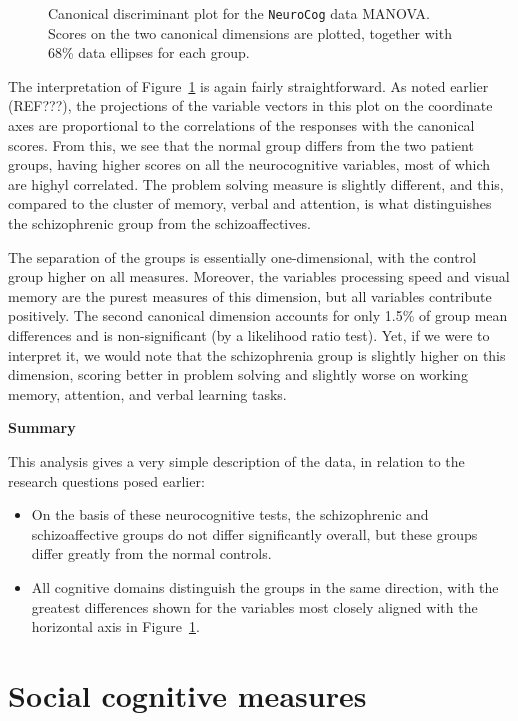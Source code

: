 \documentclass[
  letterpaper,
  10pt,
  krantz2]{krantz}
\begin{document}
{\begin{figure}[H]
{}

\caption{\label{fig-NC-candisc}Canonical discriminant plot for the
\texttt{NeuroCog} data MANOVA. Scores on the two canonical dimensions
are plotted, together with 68\% data ellipses for each group.}

\end{figure}%

The interpretation of Figure~\ref{fig-NC-candisc} is again fairly
straightforward. As noted earlier (REF???), the projections of the
variable vectors in this plot on the coordinate axes are proportional to
the correlations of the responses with the canonical scores. From this,
we see that the normal group differs from the two patient groups, having
higher scores on all the neurocognitive variables, most of which are
highyl correlated. The problem solving measure is slightly different,
and this, compared to the cluster of memory, verbal and attention, is
what distinguishes the schizophrenic group from the schizoaffectives.

The separation of the groups is essentially one-dimensional, with the
control group higher on all measures. Moreover, the variables processing
speed and visual memory are the purest measures of this dimension, but
all variables contribute positively. The second canonical dimension
accounts for only 1.5\% of group mean differences and is non-significant
(by a likelihood ratio test). Yet, if we were to interpret it, we would
note that the schizophrenia group is slightly higher on this dimension,
scoring better in problem solving and slightly worse on working memory,
attention, and verbal learning tasks.

\textbf{Summary}

This analysis gives a very simple description of the data, in relation
to the research questions posed earlier:

\begin{itemize}
\item
  On the basis of these neurocognitive tests, the schizophrenic and
  schizoaffective groups do not differ significantly overall, but these
  groups differ greatly from the normal controls.
\item
  All cognitive domains distinguish the groups in the same direction,
  with the greatest differences shown for the variables most closely
  aligned with the horizontal axis in Figure~\ref{fig-NC-candisc}.
\end{itemize}

\section{Social cognitive measures}\label{social-cognitive-measures}

}
\end{document}
